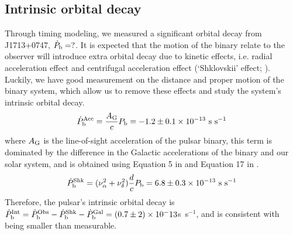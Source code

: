\subsection{Intrinsic orbital decay}
\label{sec:obdecay}
Through timing modeling, we measured a significant orbital decay from J1713+0747, $\dot{P}_{\rm b} = ?$. 
It is expected that the motion of the binary relate to the observer will introduce extra orbital decay due to kinetic effects, i.e. radial acceleration effect \citep{dt91} and centrifugal acceleration effect (`Shklovskii' effect; \citealt{shk70}). Luckily, we have good measurement on the distance and proper motion of the binary system, which allow us to remove these effects 
and study the system's intrinsic orbital decay.
\begin{equation}
\dot{P}_{\rm b}^{\rm Acc} = \frac{A_{\rm G}}{c} P_{\rm b} =
-1.2\pm0.1\times10^{-13}~{\rm s~s^{-1}}
\end{equation}
where $A_{\rm G}$ is the line-of-sight acceleration of the pulsar binary,
this term is dominated by the difference in the Galactic accelerations of the
binary and our solar system, and is obtained using
Equation 5 in \citet{nt95} and Equation 17 in \citet{lwj+09}.
\begin{equation}
\dot{P}_{\rm b}^{\rm Shk} = (\nu_{\alpha}^2+\nu_{\delta}^2)\frac{d}{c}P_{\rm
b} = 6.8\pm0.3\times10^{-13}~{\rm s~s^{-1}}
\end{equation}
Therefore, the pulsar's intrinsic orbital decay is $\dot{P}_{\rm b}^{\rm Int}
= \dot{P}_{\rm b}^{\rm Obs} - \dot{P}_{\rm b}^{\rm Shk} - \dot{P}_{\rm b}^{\rm
Gal} = (0.7\pm2)\times10^-13$s~s$^{-1}$, and is consistent with being smaller than measurable.

